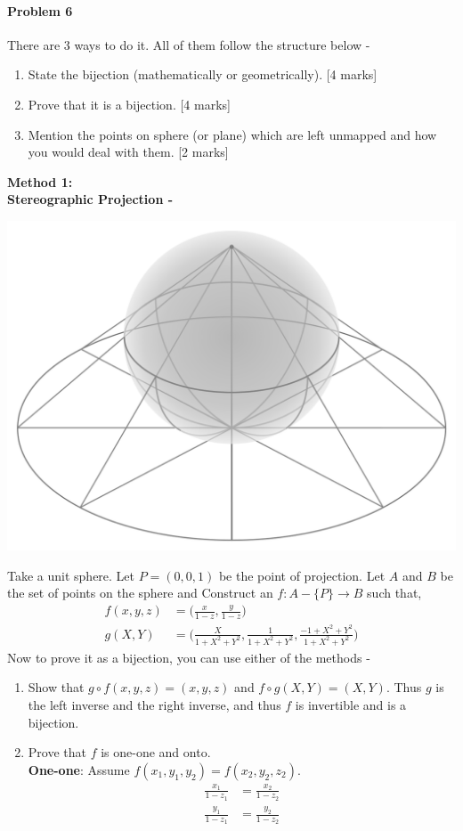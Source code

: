 \documentclass[12pt]{scrartcl}
\begin{document}
\paragraph*{Problem 6}
There are 3 ways to do it. All of them follow the structure below -
\begin{enumerate}
    \item State the bijection (mathematically or geometrically). [4 marks]
    \item Prove that it is a bijection. [4 marks]
    \item Mention the points on sphere (or plane) which are left unmapped and how you would deal with them. [2 marks]
\end{enumerate}
\textbf{Method 1:}
\\ \textbf{Stereographic Projection -} 
\begin{center}
    \includegraphics[width=0.5\linewidth]{1200px-Stereographic_projection_in_3D.svg.png}
\end{center}
Take a unit sphere. Let $P = (0,0,1)$ be the point of projection. Let $A$ and $B$ be the set of points on the sphere and Construct an $f:{A - \{P\}} \rightarrow {B}$ such that, 
\begin{align*}
    f(x,y,z) &= \bigg(\frac{x}{1-z}, \frac{y}{1-z}\bigg)
    \\ g(X,Y) &= \bigg(\frac{X}{1 + X^2 + Y^2}, \frac{1}{1 + X^2 + Y^2}, \frac{-1 + X^2 + Y^2}{1 + X^2 + Y^2}\bigg)
\end{align*}
Now to prove it as a bijection, you can use either of the methods -
\begin{enumerate}
    \item Show that $g \circ f(x,y,z) = (x,y,z)$ and $f \circ g(X,Y) = (X,Y)$. Thus $g$ is the left inverse and the right inverse, and thus $f$ is invertible and is a bijection.
    \item Prove that $f$ is one-one and onto. 
    \\ \textbf{One-one}: Assume $f(x_1,y_1,y_2) = f(x_2,y_2,z_2)$.
    \begin{align*}
        \frac{x_1}{1 - z_1} &= \frac{x_2}{1 - z_2}
        \\ \frac{y_1}{1 - z_1} &= \frac{y_2}{1 - z_2}
    \end{align*}
\end{enumerate}
\end{document}
